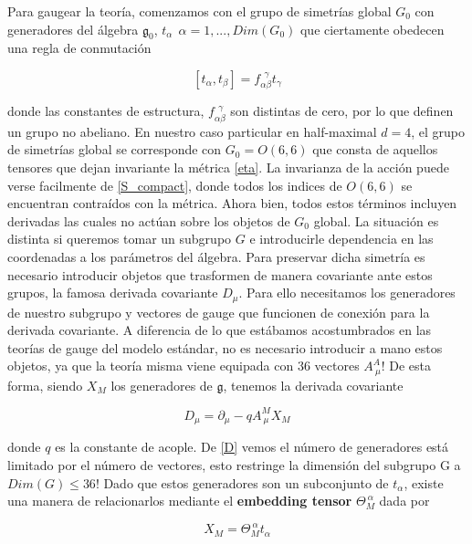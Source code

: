 \documentclass{article}
\numberwithin{equation}{section}
\begin{document}
Para gaugear la teoría, comenzamos con el grupo de simetrías global $ G_0 $ con generadores del álgebra $ \mathfrak{g}_0 $, $ t_{\alpha} \ \ \alpha=1,..., Dim(G_0)$ que ciertamente obedecen una regla de conmutación

\begin{equation}
\left[t_{\alpha}, t_{\beta}\right] = f_{\alpha \beta}^{\ \ \gamma} t_{\gamma}
\end{equation}

donde las constantes de estructura, $ f_{\alpha \beta}^{\ \ \gamma} $ son distintas de cero, por lo que definen un grupo no abeliano. En nuestro caso particular en half-maximal $ d=4 $, el grupo de simetrías global se corresponde con $ G_0=O(6,6) $ que consta de aquellos tensores que dejan invariante la métrica \ref{eta}. La invarianza de la acción puede verse facilmente de \ref{S_compact}, donde todos los indices de $ O(6,6) $ se encuentran contraídos con la métrica. Ahora bien, todos estos términos incluyen derivadas las cuales no actúan sobre los objetos de $ G_0 $ global. La situación es distinta si queremos tomar un subgrupo $ G $ e introducirle dependencia en las coordenadas a los parámetros del álgebra. Para preservar dicha simetría es necesario introducir objetos que trasformen de manera covariante ante estos grupos, la famosa derivada covariante $ D_{\mu} $. Para ello necesitamos los generadores de nuestro subgrupo y vectores de gauge que funcionen de conexión para la derivada covariante. A diferencia de lo que estábamos acostumbrados en las teorías de gauge del modelo estándar, no es necesario introducir a mano estos objetos, ya que la teoría misma viene equipada con 36 vectores $ A^A_{\ \mu} $!
De esta forma, siendo $ X_M $ los generadores de $ \mathfrak{g} $, tenemos la derivada covariante

\begin{equation}\label{D}
D_{\mu} = \partial_{\mu} - q A^M_{\ \mu} X_M 
\end{equation}

donde $ q $ es la constante de acople. De \ref{D} vemos el número de generadores está limitado por el número de vectores, esto restringe la dimensión del subgrupo G a $ Dim(G) \leq 36 $! Dado que estos generadores son un subconjunto de $ t_{\alpha} $, existe una manera de relacionarlos mediante el \textbf{embedding tensor} $ \Theta_M^{\ \alpha} $ dada por

\begin{equation}
X_M = \Theta_M^{\ \alpha} t_{\alpha}
\end{equation}
\end{document}

